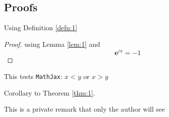\subsection{Proofs}

\begin{Lem}[A Lemma]\label{lem:1}
  \lipsum[3]
\end{Lem}

\begin{Theorem}\label{thm:1}
  Using Definition \ref{defn:1} \\
  \lipsum[4]
  \begin{proof}
    using Lemma \ref{lem:1} and
    \begin{equation}
      \label{eq:1}
      {\mathbf{e}}^{i \pi }=-1
    \end{equation}
  \end{proof}
  This tests \texttt{MathJax}: $x<y$ or $x>y$
\end{Theorem}

\lipsum[5]

\begin{Cor}\label{cor:1}
  Corollary to Theorem \ref{thm:1}.
  \\
  \lipsum[6]
\end{Cor}

\begin{privateremark}
  This is a private remark that only the author will see
\end{privateremark}

